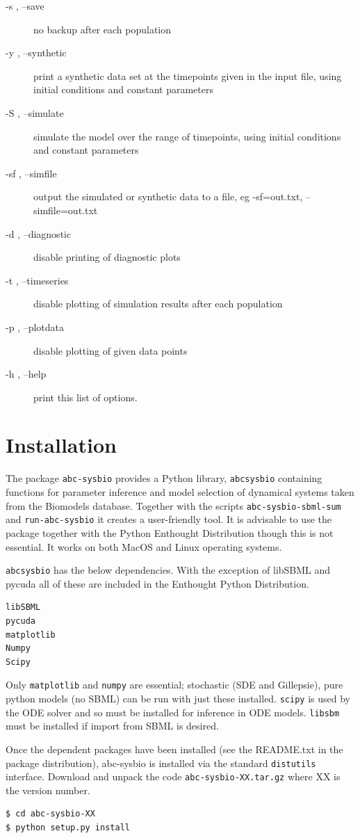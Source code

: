 \documentclass[a4paper]{report}
\begin{document}
\begin{description}
\item[-s  ,    --save]           no backup after each population
\item[-y  ,    --synthetic]      print a synthetic data set at the timepoints given in the input file, using initial conditions and constant parameters
\item[-S  ,    --simulate]       simulate the model over the range of timepoints, using initial conditions and constant parameters
\item[-sf  ,   --simfile]        output the simulated or synthetic data to a file, eg -sf=out.txt, --simfile=out.txt
\item[-d   ,   --diagnostic]     disable printing of diagnostic plots
\item[-t   ,   --timeseries]     disable plotting of simulation results after each population
\item[-p  ,    --plotdata]      disable plotting of given data points
\item[-h  ,    --help]           print this list of options.
\end{description}

\chapter{Installation}
The package \verb$abc-sysbio$ provides a Python library, \verb$abcsysbio$ containing functions for parameter inference and model selection \citep{Toni2009,ABCrejection} of dynamical systems taken from the Biomodels database. Together with the scripts \verb$abc-sysbio-sbml-sum$ and \verb$run-abc-sysbio$ it creates a user-friendly tool.
It is advisable to use the package together with the Python Enthought Distribution though this is not essential. It works on both MacOS and Linux operating systems.

\verb$abcsysbio$ has the below dependencies. With the exception of libSBML and pycuda all of these are included in the Enthought Python Distribution. 
\begin{verbatim}
libSBML
pycuda
matplotlib
Numpy
Scipy
\end{verbatim}
Only  \verb$matplotlib$ and \verb$numpy$ are essential; stochastic (SDE and Gillepsie), pure python models (no SBML) can be run with just these installed. \verb$scipy$ is used by the ODE solver and so must be installed for inference in ODE models. \verb$libsbm$ must be installed if import from SBML is desired. 

Once the dependent packages have been installed (see the README.txt in the package distribution), abc-sysbio is installed via the standard \verb$distutils$ interface. Download and unpack the code \verb$abc-sysbio-XX.tar.gz$ where XX is the version number.
\begin{verbatim}
$ cd abc-sysbio-XX
$ python setup.py install
\end{verbatim}
\end{document}
